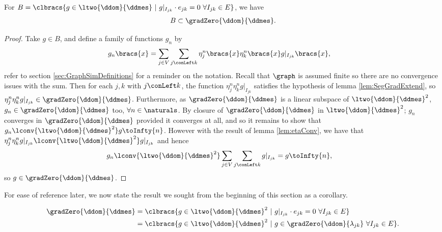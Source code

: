 \begin{prop} \label{prop:BIncGrad0}
	For $B = \clbracs{g\in\ltwo{\ddom}{\ddmes} \ \vert \ g\vert_{I_{jk}}\cdot e_{jk}=0 \ \forall I_{jk}\in E}$, we have
	\begin{align*}
		B \subset \gradZero{\ddom}{\ddmes}.
	\end{align*}
\end{prop}
\begin{proof}
	Take $g\in B$, and define a family of functions $g_n$ by
	\begin{align*}
		g_n\bracs{x} &= \sum_{j\in V}\sum_{j\conLeft k}\eta_j^n\bracs{x}\eta_k^n\bracs{x}g\vert_{I_{jk}}\bracs{x},
	\end{align*}
	refer to section \ref{sec:GraphSimDefinitions} for a reminder on the notation.
	Recall that $\graph$ is assumed finite so there are no convergence issues with the sum.
	Then for each $j,k$ with $j\conLeft k$, the function $\eta_j^n\eta_k^n g\vert_{I_{jk}}$ satisfies the hypothesis of lemma \ref{lem:SegGradExtend}, so $\eta_j^n\eta_k^n g\vert_{I_{jk}}\in\gradZero{\ddom}{\ddmes}$.
	Furthermore, as $\gradZero{\ddom}{\ddmes}$ is a linear subspace of $\ltwo{\ddom}{\ddmes}^{2}$, $g_n\in\gradZero{\ddom}{\ddmes}$ too, $\forall n\in\naturals$.
	By closure of $\gradZero{\ddom}{\ddmes}$ in $\ltwo{\ddom}{\ddmes}^2$; $g_n$ converges in $\gradZero{\ddom}{\ddmes}$ provided it converges at all, and so it remains to show that $g_n\lconv{\ltwo{\ddom}{\ddmes}^2} g \toInfty{n}$.
	However with the result of lemma \ref{lem:etaConv}, we have that $\eta_j^n\eta_k^n g\vert_{I_{jk}}\lconv{\ltwo{\ddom}{\ddmes}^2} g\vert_{I_{jk}}$ and hence
	\begin{align*}
		g_n \lconv{\ltwo{\ddom}{\ddmes}^2} &\sum_{j\in V}\sum_{j\conLeft k}g\vert_{I_{jk}} = g \toInfty{n},
	\end{align*}
	so $g\in\gradZero{\ddom}{\ddmes}$.
\end{proof}

For ease of reference later, we now state the result we sought from the beginning of this section as a corollary.
\begin{cory} \label{cory:CharacterisationGradientsZero}
	\begin{align*}
		\gradZero{\ddom}{\ddmes} &= \clbracs{g\in\ltwo{\ddom}{\ddmes}^2 \ \vert \ g\vert_{I_{jk}}\cdot e_{jk}=0 \ \forall I_{jk}\in E} \\
		&= \clbracs{g\in\ltwo{\ddom}{\ddmes}^2 \ \vert \ g\in\gradZero{\ddom}{\lambda_{jk}} \ \forall I_{jk}\in E}.
	\end{align*}
\end{cory}

